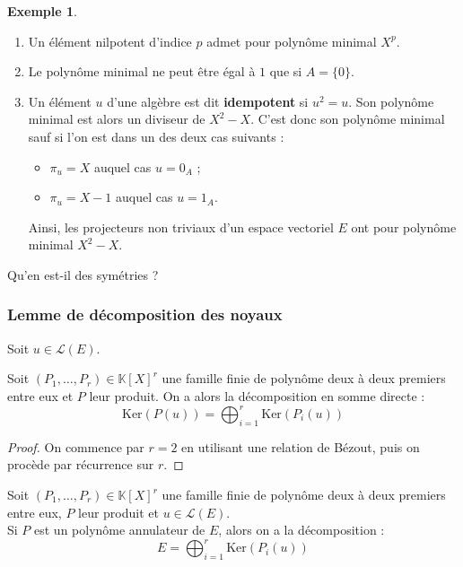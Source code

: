 \documentclass[french]{article}
\newcommand{\K}{\mathbb{K}}
\renewcommand{\ker}{\text{Ker}}
\theoremstyle{plain}
\theoremstyle{definition}
\newtheorem*{ex}{Exemple}
\theoremstyle{remark}
\begin{document}
\begin{ex}
	\begin{enumerate}
		\item Un élément nilpotent d'indice $p$ admet pour polynôme minimal $X^p$.
		\item Le polynôme minimal ne peut être égal à $1$ que si $A=\{0\}$.
		\item Un élément $u$ d'une algèbre est dit \textbf{idempotent} si $u^2=u$. Son polynôme minimal est alors un diviseur de $X^2-X$. C'est donc son polynôme minimal sauf si l'on est dans un des deux cas suivants :
		\begin{itemize}
			\item $\pi_u=X$ auquel cas $u=0_A$ ;
			\item $\pi_u=X-1$ auquel cas $u=1_A$.
		\end{itemize}
		Ainsi, les projecteurs non triviaux d'un espace vectoriel $E$ ont pour polynôme minimal $X^2-X$.
	\end{enumerate}
\end{ex}

\begin{exo}
	Qu'en est-il des symétries ?
\end{exo}

\subsubsection*{Lemme de décomposition des noyaux}

Soit $u\in\mathcal{L}(E)$.

\begin{thm}%
	Soit $(P_1,\ldots,P_r)\in\K[X]^r$ une famille finie de polynôme deux à deux premiers entre eux et $P$ leur produit. On a alors la décomposition en somme directe : $$\ker(P(u))=\bigoplus_{i=1}^r\ker(P_i(u))$$
\end{thm}
\begin{proof}
	On commence par $r=2$ en utilisant une relation de Bézout, puis on procède par récurrence sur $r$.
\end{proof}

\begin{cor}%
	Soit $(P_1,\ldots,P_r)\in\K[X]^r$ une famille finie de polynôme deux à deux premiers entre eux, $P$ leur produit et $u\in\mathcal{L}(E)$. \\
	Si $P$ est un polynôme annulateur de $E$, alors on a la décomposition :
	$$E=\bigoplus_{i=1}^r\ker(P_i(u))$$
\end{cor}
\end{document}
